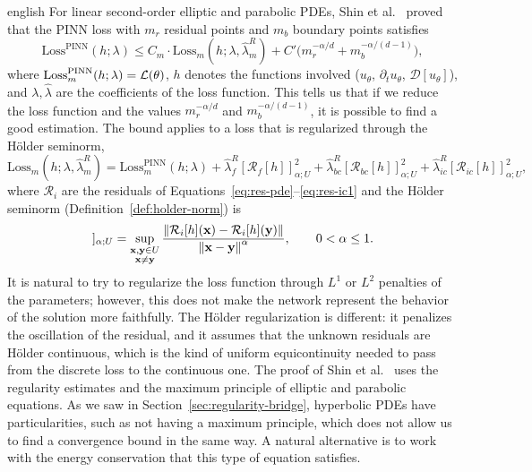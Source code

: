 \documentclass[0000.tex]{subfiles}
\begin{document}
\begin{hyphenrules}{english}
For linear second-order elliptic and parabolic PDEs, Shin et al.~\cite{shin2020convergence} proved that the
PINN loss with $m_r$ residual points and $m_b$ boundary points satisfies
\begin{equation}
  \mathrm{Loss}^{\mathrm{PINN}}(h;\lambda)\le C_m\cdot\mathrm{Loss}_m(h;\lambda,\hat\lambda^{R}_m)
  +C'\big(m_r^{-\alpha/d}+m_b^{-\alpha/(d-1)}\big),
  \label{eq:shin-bound}
\end{equation}
where $\mathrm{Loss}^{\mathrm{PINN}}_m(h;\lambda)=\mathcal{L}(\theta)$, $h$ denotes the functions involved
($u_\theta$, $\partial_t u_\theta$, $\mathcal{D}[u_\theta]$), and $\lambda,\hat\lambda$ are the
coefficients of the loss function.
This tells us that if we reduce the loss function and the values $m_r^{-\alpha/d}$ and
$m_b^{-\alpha/(d-1)}$, it is possible to find a good estimation. The bound applies to a loss that is
regularized through the Hölder seminorm,
\begin{equation}
  \mathrm{Loss}_m(h;\lambda,\hat\lambda^{R}_m)=\mathrm{Loss}^{\mathrm{PINN}}_m(h;\lambda)
  +\hat\lambda^{R}_f[\mathcal{R}_f[h]]^2_{\alpha;U}+\hat\lambda^{R}_{bc}[\mathcal{R}_{bc}[h]]^2_{\alpha;U}
  +\hat\lambda^{R}_{ic}[\mathcal{R}_{ic}[h]]^2_{\alpha;U},
  \label{eq:shin-regularized}
\end{equation}
where $\mathcal{R}_i$ are the residuals of Equations~\eqref{eq:res-pde}--\eqref{eq:res-ic1} and the Hölder seminorm
(Definition~\ref{def:holder-norm}) is
\begin{equation}
  [\mathcal{R}_i[h]]_{\alpha;U}=\sup_{\substack{\mathbf{x},\mathbf{y}\in U\\ \mathbf{x}\neq\mathbf{y}}}
  \frac{\norm{\mathcal{R}_i[h](\mathbf{x})-\mathcal{R}_i[h](\mathbf{y})}}{\norm{\mathbf{x}-\mathbf{y}}^{\alpha}},\qquad0<\alpha\le1.
  \label{eq:holder-seminorm-loss}
\end{equation}
It is natural to try to regularize the loss function through $L^1$ or $L^2$ penalties of the
parameters; however, this does not make the network represent the behavior of the solution more
faithfully. The Hölder regularization is different: it penalizes the oscillation of the residual, and it
assumes that the unknown residuals are Hölder continuous, which is the kind of uniform equicontinuity
needed to pass from the discrete loss to the continuous one. The proof of Shin et al.~\cite{shin2020convergence}
uses the regularity estimates and the maximum principle of elliptic and parabolic equations. As we saw
in Section~\ref{sec:regularity-bridge}, hyperbolic PDEs have particularities, such as not having a maximum
principle, which does not allow us to find a convergence bound in the same way. A natural alternative is
to work with the energy conservation that this type of equation satisfies.


\end{hyphenrules}
\end{document}
